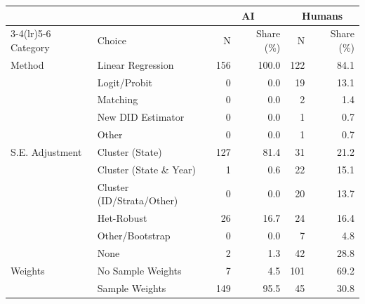 \begin{tabular}{@{}l l r r r r@{}}
\toprule
 &  & \multicolumn{2}{c}{AI} & \multicolumn{2}{c}{Humans} \\
\cmidrule(lr){3-4}\cmidrule(lr){5-6}
Category & Choice & N & Share (\%) & N & Share (\%) \\
\midrule
Method & Linear Regression & 156 & 100.0 & 122 & 84.1 \\
 & Logit/Probit & 0 & 0.0 & 19 & 13.1 \\
 & Matching & 0 & 0.0 & 2 & 1.4 \\
 & New DID Estimator & 0 & 0.0 & 1 & 0.7 \\
 & Other & 0 & 0.0 & 1 & 0.7 \\
S.E. Adjustment & Cluster (State) & 127 & 81.4 & 31 & 21.2 \\
 & Cluster (State \& Year) & 1 & 0.6 & 22 & 15.1 \\
 & Cluster (ID/Strata/Other) & 0 & 0.0 & 20 & 13.7 \\
 & Het-Robust & 26 & 16.7 & 24 & 16.4 \\
 & Other/Bootstrap & 0 & 0.0 & 7 & 4.8 \\
 & None & 2 & 1.3 & 42 & 28.8 \\
Weights & No Sample Weights & 7 & 4.5 & 101 & 69.2 \\
 & Sample Weights & 149 & 95.5 & 45 & 30.8 \\
\bottomrule
\end{tabular}
